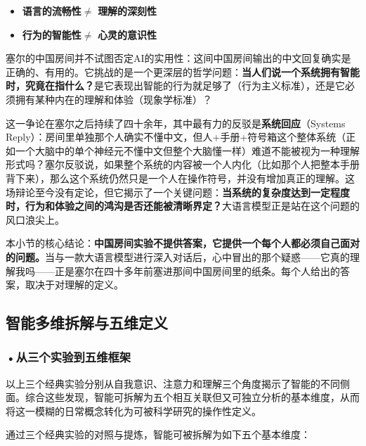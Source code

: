 \begin{itemize}[leftmargin=*, itemsep=4pt]
\item \textbf{语言的流畅性}$\neq$ \textbf{理解的深刻性}
\item \textbf{行为的智能性}$\neq$ \textbf{心灵的意识性}
\end{itemize}

塞尔的中国房间并不试图否定AI的实用性：这间中国房间输出的中文回复确实是正确的、有用的。它挑战的是一个更深层的哲学问题：\textbf{当人们说一个系统拥有智能时，究竟在指什么？}是它表现出智能的行为就足够了（行为主义标准），还是它必须拥有某种内在的理解和体验（现象学标准）？

这一争论在塞尔之后持续了四十余年，其中最有力的反驳是\textbf{系统回应}（Systems Reply）：房间里单独那个人确实不懂中文，但人+手册+符号箱这个整体系统（正如一个大脑中的单个神经元不懂中文但整个大脑懂一样）难道不能被视为一种理解形式吗？塞尔反驳说，如果整个系统的内容被一个人内化（比如那个人把整本手册背下来），那么这个系统仍然只是一个人在操作符号，并没有增加真正的理解。这场辩论至今没有定论，但它揭示了一个关键问题：\textbf{当系统的复杂度达到一定程度时，行为和体验之间的鸿沟是否还能被清晰界定？}大语言模型正是站在这个问题的风口浪尖上。

本小节的核心结论：\textbf{中国房间实验不提供答案，它提供一个每个人都必须自己面对的问题。}当与一款大语言模型进行深入对话后，心中冒出的那个疑惑——它真的理解我吗——正是塞尔在四十多年前塞进那间中国房间里的纸条。每个人给出的答案，取决于对理解的定义。

\subsection{智能多维拆解与五维定义}

\subsubsection*{\textbf{•从三个实验到五维框架}}

以上三个经典实验分别从自我意识、注意力和理解三个角度揭示了智能的不同侧面。综合这些发现，智能可拆解为五个相互关联但又可独立分析的基本维度，从而将这一模糊的日常概念转化为可被科学研究的操作性定义。

通过三个经典实验的对照与提炼，智能可被拆解为如下五个基本维度：

